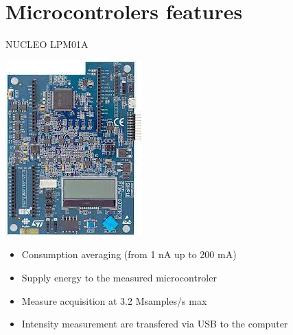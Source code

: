 \documentclass[
	11pt, %
]{beamer}
\begin{document}
\section{Microcontrolers features}

\begin{frame}{NUCLEO LPM01A}
	\centering
    \begin{minipage}{0.4\textwidth}
		\includegraphics[scale = 0.5]{images/lpm01a.jpeg}
	\end{minipage}
	\begin{minipage}{0.50\textwidth}
		\centering
		\begin{itemize}
			\item Consumption averaging (from 1 nA up to 200 mA)
			\item Supply energy to the measured microcontroler
			\item Measure acquisition at 3.2 Msamples/s max
			\item Intensity measurement are transfered via USB to the computer
		\end{itemize}
		\end{minipage}
\end{frame}
\end{document}
